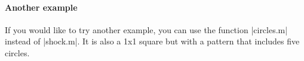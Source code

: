 \paragraph{Another example}%
If you would like to try another example, you can use the function \lstinlinebg|circles.m| instead of
\lstinlinebg|shock.m|. It is also a 1x1 square but with a pattern that includes five circles.

\clearpage %
